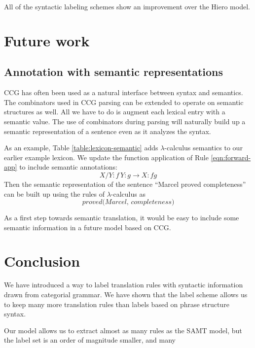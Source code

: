 \documentclass[a4paper]{article}
\begin{document}
All of the syntactic labeling schemes show an improvement over the Hiero model.

\section{Future work}

\subsection{Annotation with semantic representations}

CCG has often been used as a natural interface between syntax and semantics. The combinators used in CCG parsing can be extended to operate on semantic structures as well. All we have to do is augment each lexical entry with a semantic value. The use of combinators during parsing will naturally build up a semantic representation of a sentence even as it analyzes the syntax.

As an example, Table \ref{table:lexicon-semantic} adds $\lambda$-calculus semantics to our earlier example lexicon. We update the function application of Rule \ref{eqn:forward-app} to include semantic annotations:
\begin{equation}
X/Y:f \, Y:g \to X:fg
\end{equation}
Then the semantic representation of the sentence ``Marcel proved completeness'' can be built up using the rules of $\lambda$-calculus as
\begin{equation}
\textit{proved(Marcel, completeness)}
\end{equation}

As a first step towards semantic translation, it would be easy to include some semantic information in a future model based on CCG. 

\section{Conclusion}

We have introduced a way to label translation rules with syntactic information drawn from categorial grammar. We have shown that the label scheme allows us to keep many more translation rules than labels based on phrase structure syntax.

Our model allows us to extract almost as many rules as the SAMT model, but the label set is an order of magnitude smaller, and many




\end{document}
